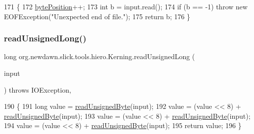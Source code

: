 \begin{DoxyCode}
171                                                                         \{
172         \mbox{\hyperlink{classorg_1_1newdawn_1_1slick_1_1tools_1_1hiero_1_1_kerning_a6c58cfffdf2d5619a257504e489deb1b}{bytePosition}}++;
173         \textcolor{keywordtype}{int} b = input.read();
174         \textcolor{keywordflow}{if} (b == -1) \textcolor{keywordflow}{throw} \textcolor{keyword}{new} EOFException(\textcolor{stringliteral}{"Unexpected end of file."});
175         \textcolor{keywordflow}{return} b;
176     \}
\end{DoxyCode}
\mbox{\label{classorg_1_1newdawn_1_1slick_1_1tools_1_1hiero_1_1_kerning_aa3c458b9468029d2e7d2a1eccba11453}} 
\subsubsection{\texorpdfstring{read\+Unsigned\+Long()}{readUnsignedLong()}}
{\footnotesize\ttfamily long org.\+newdawn.\+slick.\+tools.\+hiero.\+Kerning.\+read\+Unsigned\+Long (\begin{DoxyParamCaption}\item[{Input\+Stream}]{input }\end{DoxyParamCaption}) throws I\+O\+Exception\hspace{0.3cm}{\ttfamily [inline]}, {\ttfamily [private]}}


\begin{DoxyCode}
190                                                                          \{
191         \textcolor{keywordtype}{long} value = \mbox{\hyperlink{classorg_1_1newdawn_1_1slick_1_1tools_1_1hiero_1_1_kerning_a433922be5e8ae2ea7ebecc17adb480d1}{readUnsignedByte}}(input);
192         value = (value << 8) + \mbox{\hyperlink{classorg_1_1newdawn_1_1slick_1_1tools_1_1hiero_1_1_kerning_a433922be5e8ae2ea7ebecc17adb480d1}{readUnsignedByte}}(input);
193         value = (value << 8) + \mbox{\hyperlink{classorg_1_1newdawn_1_1slick_1_1tools_1_1hiero_1_1_kerning_a433922be5e8ae2ea7ebecc17adb480d1}{readUnsignedByte}}(input);
194         value = (value << 8) + \mbox{\hyperlink{classorg_1_1newdawn_1_1slick_1_1tools_1_1hiero_1_1_kerning_a433922be5e8ae2ea7ebecc17adb480d1}{readUnsignedByte}}(input);
195         \textcolor{keywordflow}{return} value;
196     \}
\end{DoxyCode}
\mbox{\label{classorg_1_1newdawn_1_1slick_1_1tools_1_1hiero_1_1_kerning_a8e409fe133f0b1741ba0c5a52ef13910}} 
